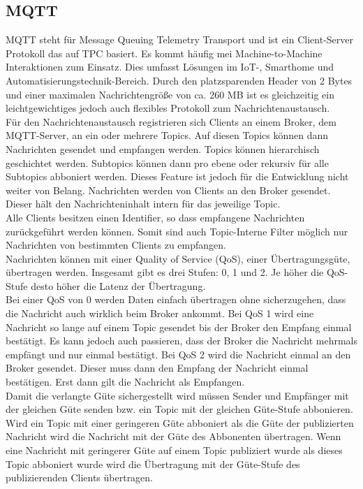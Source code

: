 \documentclass[11pt,a4paper]{report}
\begin{document}
\subsection*{MQTT}
MQTT steht für Message Queuing Telemetry Transport und ist ein Client-Server Protokoll das auf TPC basiert.
Es kommt häufig mei Machine-to-Machine Interaktionen zum Einsatz.
Dies umfasst Lösungen im IoT-, Smarthome und Automatisierungstechnik-Bereich.
Durch den platzsparenden Header von 2 Bytes und einer maximalen Nachrichtengröße von ca. 260 MB ist es gleichzeitig ein leichtgewichtiges jedoch auch flexibles Protokoll zum Nachrichtenaustausch.
\\
Für den Nachrichtenaustausch registrieren sich Clients an einem Broker, dem MQTT-Server, an ein oder mehrere Topics.
Auf diesen Topics können dann Nachrichten gesendet und empfangen werden.
Topics können hierarchisch geschichtet werden.
Subtopics können dann pro ebene oder rekursiv für alle Subtopics abboniert werden.
Dieses Feature ist jedoch für die Entwicklung nicht weiter von Belang.
Nachrichten werden von Clients an den Broker gesendet.
Dieser hält den Nachrichteninhalt intern für das jeweilige Topic.
\\
Alle Clients besitzen einen Identifier, so dass empfangene Nachrichten zurückgeführt werden können.
Somit sind auch Topic-Interne Filter möglich nur Nachrichten von bestimmten Clients zu empfangen.
\\
Nachrichten können mit einer Quality of Service (QoS), einer Übertragungsgüte, übertragen werden.
Insgesamt gibt es drei Stufen: 0, 1 und 2.
Je höher die QoS-Stufe desto höher die Latenz der Übertragung.
\\
Bei einer QoS von 0 werden Daten einfach übertragen ohne sicherzugehen, dass die Nachricht auch wirklich beim Broker ankommt. 
Bei QoS 1 wird eine Nachricht so lange auf einem Topic gesendet bis der Broker den Empfang einmal bestätigt.
Es kann jedoch auch passieren, dass der Broker die Nachricht mehrmals empfängt und nur einmal bestätigt.
Bei QoS 2 wird die Nachricht einmal an den Broker gesendet.
Dieser muss dann den Empfang der Nachricht einmal bestätigen.
Erst dann gilt die Nachricht als Empfangen.
\\
Damit die verlangte Güte sichergestellt wird müssen Sender und Empfänger mit der gleichen Güte senden bzw. ein Topic mit der gleichen Güte-Stufe abbonieren.
Wird ein Topic mit einer geringeren Güte abboniert als die Güte der publizierten Nachricht wird die Nachricht mit der Güte des Abbonenten übertragen.
Wenn eine Nachricht mit geringerer Güte auf einem Topic publiziert wurde als dieses Topic abboniert wurde wird die Übertragung mit der Güte-Stufe des publizierenden Clients übertragen.
\end{document}
